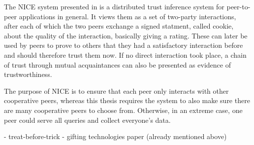 The NICE system presented in \cite{sherwood2006cooperative} is a distributed
trust inference system for peer-to-peer applications in general. It views them
as a set of two-party interactions, after each of which the two peers exchange a
signed statment, called cookie, about the quality of the interaction, basically
giving a rating. These can later be used by peers to prove to others that they
had a satisfactory interaction before and should therefore trust them now. If no
direct interaction took place, a chain of trust through mutual acquaintances can
also be presented as evidence of trustworthiness.

The purpose of NICE is to ensure that each peer only interacts with other
cooperative peers, whereas this thesis requires the system to also make sure
there are many cooperative peers to choose from. Otherwise, in an extreme case,
one peer could serve all queries and collect everyone's data.

- treat-before-trick
- gifting technologies paper (already mentioned above)
